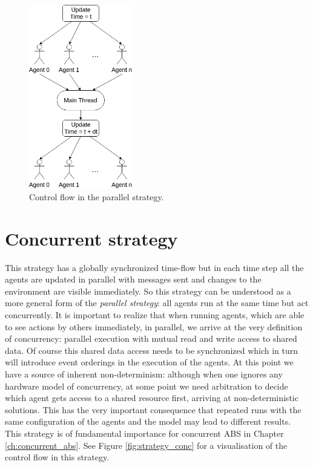 \begin{figure}[H]
	\centering
	\includegraphics[width=0.4\textwidth, angle=0]{./fig/implabs/parallel.png}
	\caption{Control flow in the parallel strategy.}
	\label{fig:strategy_par}
\end{figure}

\section{Concurrent strategy}
\label{sub:con_strategy}
This strategy has a globally synchronized time-flow but in each time step all the agents are updated in parallel with messages sent and changes to the environment are visible immediately. So this strategy can be understood as a more general form of the \textit{parallel strategy}: all agents run at the same time but act concurrently. It is important to realize that when running agents, which are able to see actions by others immediately, in parallel, we arrive at the very definition of concurrency: parallel execution with mutual read and write access to shared data. Of course this shared data access needs to be synchronized which in turn will introduce event orderings in the execution of the agents. At this point we have a source of inherent non-determinism: although when one ignores any hardware model of concurrency, at some point we need arbitration to decide which agent gets access to a shared resource first, arriving at non-deterministic solutions. This has the very important consequence that repeated runs with the same configuration of the agents and the model may lead to different results. This strategy is of fundamental importance for concurrent ABS in Chapter \ref{ch:concurrent_abs}. See Figure \ref{fig:strategy_conc} for a visualisation of the control flow in this strategy.

